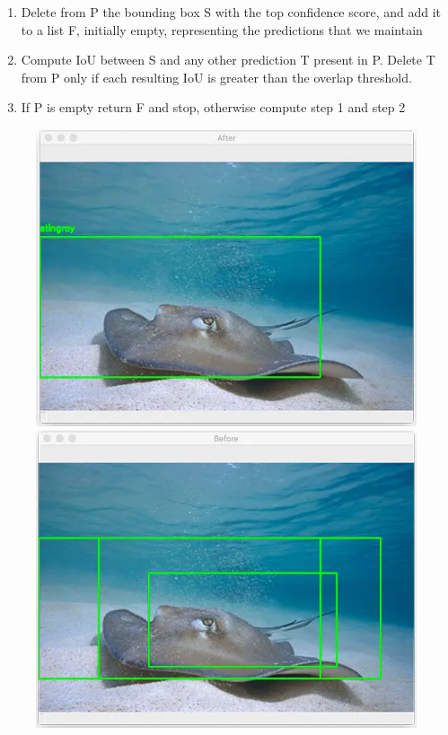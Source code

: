 \begin{enumerate}
    \item Delete from P the bounding box S with the top confidence score, and add it to a list F, initially empty, representing the predictions that we maintain
    \item Compute IoU between S and any other prediction T present in P. Delete T from P only if each resulting IoU is greater than the overlap threshold.
    \item If P is empty return F and stop, otherwise compute step 1 and step 2
\end{enumerate}
\begin{center}
    \begin{figure}[!htb]
        \begin{minipage}{0.5\textwidth}
            \centering
            \includegraphics[scale=0.5]{images/detection_chapter/after_nms.PNG}
        \end{minipage}
        \begin{minipage}{0.5\textwidth}
            \centering
            \includegraphics[scale=0.5]{images/detection_chapter/before_nms.PNG} 
        \end{minipage}
    \end{figure}
\end{center}
